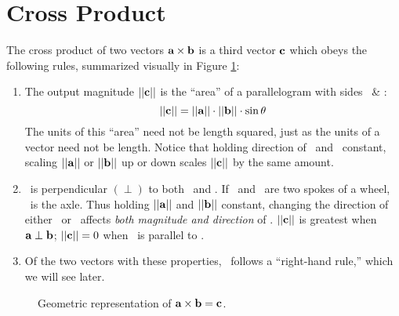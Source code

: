 \section{Cross Product}
The cross product of two vectors $\textbf{a}\times\textbf{b}$ is a third vector $\textbf{c}$ which obeys the following rules, summarized visually in Figure \ref{crossproduct}:
\begin{enumerate}
    \item The output magnitude $||\textbf{c}||$ is the ``area'' of a parallelogram with sides \va\ \& \vb:
	\begin{equation}
	||\textbf{c}||=||\textbf{a}||\cdot||\textbf{b}||\cdot\sin\theta\label{mag}
	\end{equation}
The units of this ``area'' need not be length squared, just as the units of a vector need not be length. Notice that holding direction of \va\ and \vb\ constant, scaling $||\textbf{a}||$ or $||\textbf{b}||$ up or down scales $||\textbf{c}||$ by the same amount.
    \item \vc\ is perpendicular $(\perp)$ to both \va\ and \vb. If \va\ and \vb\ are two spokes of a wheel, \vc\ is the axle. Thus holding $||\textbf{a}||$ and $||\textbf{b}||$ constant, changing the direction of either \va\ or \vb\ affects \emph{both magnitude and direction} of \vc. $||\textbf{c}||$ is greatest when $\textbf{a} \perp \textbf{b}$; $||\textbf{c}|| = 0$ when \va\ is parallel to \vb.\label{perp}
    \item Of the two vectors with these properties, \vc\ follows a ``right-hand rule,'' which we will see later.
\end{enumerate}
\begin{figure}
\begin{center}
  	\end{center}
	\caption{Geometric representation of $\textbf{a}\times\textbf{b}=\textbf{c}$.}
	\label{crossproduct}
	\end{figure}

